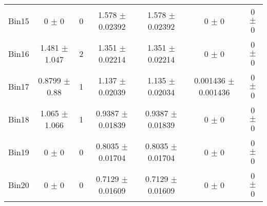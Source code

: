 \begin{tabular}{@{\extracolsep{4pt}}lcccccc@{}}
     Bin15 & 0 $\pm$ 0 & 0 & 1.578 $\pm$ 0.02392 & 1.578 $\pm$ 0.02392 & 0 $\pm$ 0 & 0 $\pm$ 0 \\ 
     Bin16 & 1.481 $\pm$ 1.047 & 2 & 1.351 $\pm$ 0.02214 & 1.351 $\pm$ 0.02214 & 0 $\pm$ 0 & 0 $\pm$ 0 \\ 
     Bin17 & 0.8799 $\pm$ 0.88 & 1 & 1.137 $\pm$ 0.02039 & 1.135 $\pm$ 0.02034 & 0.001436 $\pm$ 0.001436 & 0 $\pm$ 0 \\ 
     Bin18 & 1.065 $\pm$ 1.066 & 1 & 0.9387 $\pm$ 0.01839 & 0.9387 $\pm$ 0.01839 & 0 $\pm$ 0 & 0 $\pm$ 0 \\ 
     Bin19 & 0 $\pm$ 0 & 0 & 0.8035 $\pm$ 0.01704 & 0.8035 $\pm$ 0.01704 & 0 $\pm$ 0 & 0 $\pm$ 0 \\ 
     Bin20 & 0 $\pm$ 0 & 0 & 0.7129 $\pm$ 0.01609 & 0.7129 $\pm$ 0.01609 & 0 $\pm$ 0 & 0 $\pm$ 0 \\ 
\hline\hline
  \end{tabular}
